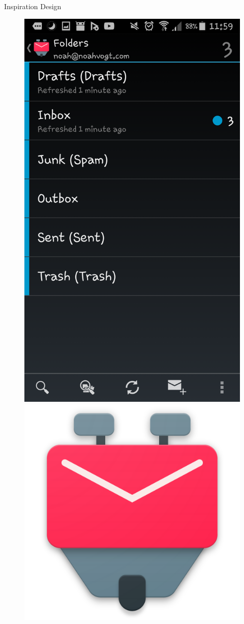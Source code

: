 \documentclass[aspectratio=169]{beamer}
\begin{document}
\begin{frame}[plain]{Inspiration Design}
\begin{varwidth}{.3\textwidth}
    \end{varwidth}
    \hfill
    \begin{varwidth}{.3\textwidth}\pause
        \begin{figure}
        \centering
        \includegraphics[width=.8\textwidth]{media/k9-screenshot.png}\\
        \vspace{.5cm}
        \includegraphics[width=.25\textwidth]{media/k9-logo.png}
        \end{figure}
    \end{varwidth}

\end{frame}
\end{document}
